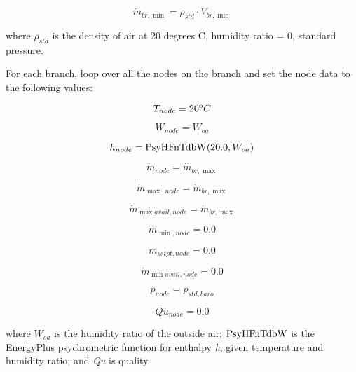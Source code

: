 \begin{equation}
{\dot m_{br,\min }} = {\rho_{std}} \cdot {\dot V_{br,\min }}
\end{equation}

where \({\rho_{std}}\) is the density of air at 20 degrees C, humidity ratio = 0, standard pressure.

For each branch, loop over all the nodes on the branch and set the node data to the following values:

\begin{equation}
{T_{node}} = {20^{\rm{o}}}C
\end{equation}

\begin{equation}
{W_{node}} = {W_{oa}}
\end{equation}

\begin{equation}
{h_{node}} = {\mathop{\rm PsyHFnTdbW}\nolimits} {\rm{(}}20.0,{W_{oa}}{\rm{)}}
\end{equation}

\begin{equation}
{\dot m_{node}} = {\dot m_{br,\max }}
\end{equation}

\begin{equation}
{\dot m_{\max ,node}} = {\dot m_{br,\max }}
\end{equation}

\begin{equation}
{\dot m_{\max avail,node}} = {\dot m_{br,\max }}
\end{equation}

\begin{equation}
{\dot m_{\min ,node}} = 0.0
\end{equation}

\begin{equation}
{\dot m_{setpt,node}} = 0.0
\end{equation}

\begin{equation}
{\dot m_{\min avail,node}} = 0.0
\end{equation}

\begin{equation}
{p_{node}} = {p_{std,baro}}
\end{equation}

\begin{equation}
Q{u_{node}} = 0.0
\end{equation}

where \({W_{oa}}\) is the humidity ratio of the outside air; \({\rm{PsyHFnTdbW}}\) is the EnergyPlus psychrometric function for enthalpy \emph{h}, given temperature and humidity ratio; and \emph{Qu} is quality.

